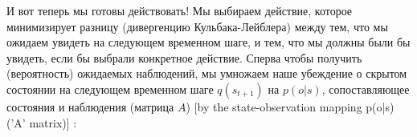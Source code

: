 \documentclass[twoside,leqno, 11pt]{article}
\begin{document}
	
	И вот теперь мы готовы действовать! Мы выбираем действие, которое минимизирует разницу (дивергенцию Кульбака-Лейблера) между тем, что мы ожидаем увидеть на следующем временном шаге, и тем, что мы должны были бы увидеть, если бы выбрали конкретное действие. Сперва чтобы получить (вероятность) ожидаемых наблюдений, мы умножаем наше убеждение о скрытом состоянии на следующем временном шаге $q(s_{t+1})$ на $p(o|s)$, сопоставляющее состояния и наблюдения (матрица $A$) [by the state-observation mapping p(o|s) ('A' matrix)] :
	
	\begin{figure}[h]
	\end{figure}
	
	
\end{document}
